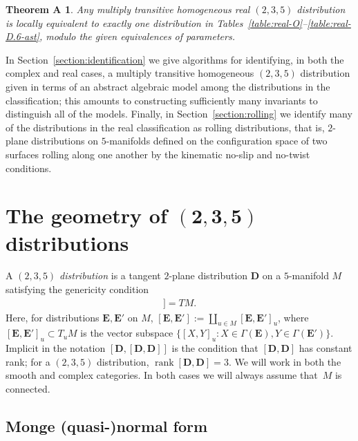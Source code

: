 \documentclass[pdftex]{sigma}
\newtheorem*{theoremA}{Theorem A}
\DeclareMathOperator{\rank}{rank}
\newcommand{\mbD}{\mathbf{D}}
\newcommand{\mbE}{\mathbf{E}}
\numberwithin{equation}{section}
\begin{document}
\begin{theoremA}\label{theorem:classification-real} Any multiply transitive homogeneous real $(2, 3, 5)$ distribution is locally equivalent to exactly one distribution in Tables~{\rm \ref{table:real-O}--\ref{table:real-D.6-ast}}, modulo the given equivalences of parameters.
\end{theoremA}

In Section~\ref{section:identification} we give algorithms for identifying, in both the complex and real cases, a multiply transitive homogeneous $(2, 3, 5)$ distribution given in terms of an abstract algebraic model among the distributions in the classification; this amounts to constructing sufficiently many invariants to distinguish all of the models. Finally, in Section~\ref{section:rolling} we identify many of the distributions in the real classification as rolling distributions, that is, $2$-plane distributions on $5$-manifolds defined on the configuration space of two surfaces rolling along one another by the kinematic no-slip and no-twist conditions.

\section[The geometry of $(2,3,5)$ distributions]{The geometry of $\boldsymbol{(2,3,5)}$ distributions}

A \textit{$(2, 3, 5)$ distribution} is a tangent $2$-plane distribution $\mbD$ on a $5$-manifold $M$ satisfying the genericity condition
\begin{gather*}
	[\mbD, [\mbD, \mbD]] = TM .
\end{gather*}
Here, for distributions $\mbE, \mbE'$ on $M$, $[\mbE, \mbE'] := \coprod_{u \in M} [\mbE, \mbE']_u$, where $[\mbE, \mbE']_u \subset T_u M$ is the vector subspace $\{[X, Y]_u \colon X \in \Gamma(\mbE), Y \in \Gamma(\mbE')\}$. Implicit in the notation $[\mbD, [\mbD, \mbD]]$ is the condition that $[\mbD, \mbD]$ has constant rank; for a $(2, 3, 5)$ distribution, $\rank{}[\mbD, \mbD] = 3$. We will work in both the smooth and complex categories. In both cases we will always assume that~$M$ is connected.

\subsection{Monge (quasi-)normal form}
\end{document}

